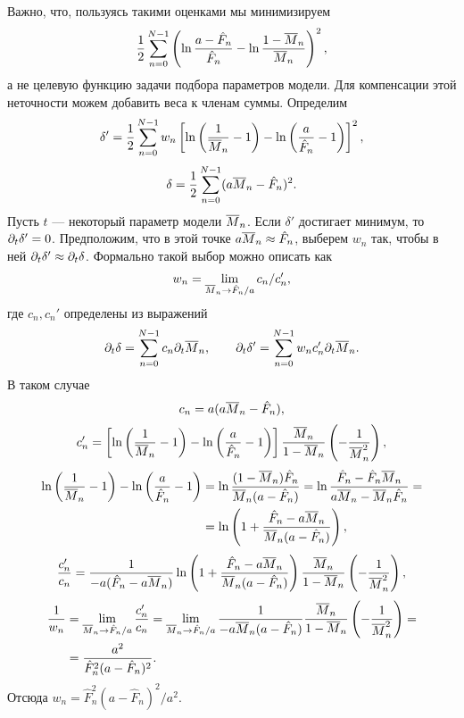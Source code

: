 Важно, что, пользуясь такими оценками мы минимизируем
\[
  \frac{1}{2}\sum_{n=0}^{N-1}\left(\ln \frac{a-\hat F_{n}}{\hat F_{n}}-
  \ln\frac{1-\overline{M}_{n}}{\overline{M}_{n}}
  \right)^{2},
\]
а не целевую функцию задачи подбора параметров модели. Для компенсации этой
неточности можем добавить веса к членам суммы. Определим
\[
  \delta'=\frac{1}{2}\sum_{n=0}^{N-1}w_{n}
  \left[
    \ln \left(\frac{1}{\overline{M}_{n}}-1\right)-
    \ln \left(\frac{a}{\hat F_{n}}-1\right)
    \right]^{2},
\]
\[
  \delta=\frac{1}{2}\sum_{n=0}^{N-1}(a\overline{M}_{n}-\hat F_{n})^{2}.
\]
Пусть $t$ --- некоторый параметр модели $\overline{M}_{n}$. Если $\delta'$ достигает
минимум, то $\partial_{t}\delta'=0$. Предположим, что в этой точке
$a\overline{M}_{n}\approx\hat F_{n}$, выберем $w_{n}$ так, чтобы в ней
$\partial_{t}\delta'\approx\partial_{t}\delta$. Формально такой выбор можно описать как
\[
  w_{n}=\lim_{\overline{M}_{n}\to \hat F_{n}/a}c_{n}/c'_{n},
\]
где $c_{n},c_{n}'$ определены из выражений
\[
  \partial_{t}\delta = \sum_{n=0}^{N-1}c_{n}\partial_{t}\overline{M}_{n},\qquad
  \partial_{t}\delta' = \sum_{n=0}^{N-1}w_{n}c'_{n}\partial_{t}\overline{M}_{n}.
\]
В таком случае
\[
  c_{n}=a(a\overline{M}_{n}-\hat F_{n}),
\]
\[
  c'_{n}=\left[
    \ln \left(\frac{1}{\overline{M}_{n}}-1\right)-
    \ln \left(\frac{a}{\hat F_{n}}-1\right)
    \right]\frac{\overline{M}_{n}}{1-\overline{M}_{n}}\left(-\frac{1}{\overline{M}_{n}^{2}}\right),
\]
\[
  \begin{aligned}
    \ln \left(\frac{1}{\overline{M}_{n}}-1\right)-
    \ln \left(\frac{a}{\hat F_{n}}-1\right)
     & =
    \ln
    \frac{(1-\overline{M}_{n})\hat F_{n}}{\overline{M}_{n}(a-\hat F_{n})}=
    \ln\frac{\hat F_{n}-\hat F_{n}\overline{M}_{n}}{a\overline{M}_{n}-\overline{M}_{n}\hat F_{n}}=  \\
     & =\ln\left(1+\frac{\hat F_{n}-a\overline{M}_{n}}{\overline{M}_{n}(a-\hat F_{n})}\right),
  \end{aligned}
\]
\[
  \frac{c'_{n}}{c_{n}}=\frac{1}{-a(\hat F_{n}-a\overline{M}_{n})}
  \ln\left(1+\frac{\hat F_{n}-a\overline{M}_{n}}{\overline{M}_{n}(a-\hat F_{n})}\right)
  \frac{\overline{M}_{n}}{1-\overline{M}_{n}}\left(-\frac{1}{\overline{M}_{n}^{2}}\right),
\]
\[
  \begin{aligned}
    \frac{1}{w_{n}}
     & =\lim_{\overline{M}_{n}\to\hat F_{n}/a}\frac{c'_{n}}{c_{n}}=
    \lim_{\overline{M}_{n}\to\hat F_{n}/a}
    \frac{1}{-a\overline{M}_{n}(a-\hat F_{n})}\frac{\overline{M}_{n}}{1-\overline{M}_{n}}
    \left(-\frac{1}{\overline{M}_{n}^{2}}\right)=                   \\
     & =\frac{a^{2}}{\hat F_{n}^{2}(a-\hat F_{n})^{2}}.
  \end{aligned}
\]
Отсюда $w_{n}=\hat F_{n}^{2}(a-\hat F_{n})^{2}/a^{2}$.

